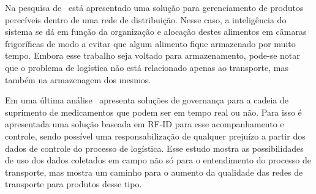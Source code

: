 Na pesquisa de~ está apresentado uma solução para gerenciamento de produtos perecíveis dentro de uma rede de distribuição. Nesse caso, a inteligência do sistema se dá em função da organização e alocação destes alimentos em câmaras frigoríficas de modo a evitar que algum alimento fique armazenado por muito tempo. Embora esse trabalho seja voltado para armazenamento, pode-se notar que o problema de logística não está relacionado apenas ao transporte, mas também na armazenagem dos mesmos.

Em uma última análise~ apresenta soluções de governança para a cadeia de suprimento de medicamentos que podem ser em tempo real ou não. Para isso é apresentada uma solução baseada em RF-ID para esse acompanhamento e controle, sendo possível uma responsabilização de qualquer prejuízo a partir dos dados de controle do processo de logística. Esse estudo mostra as possibilidades de uso dos dados coletados em campo não só para o entendimento do processo de transporte, mas mostra um caminho para o aumento da qualidade das redes de transporte para produtos desse tipo.



